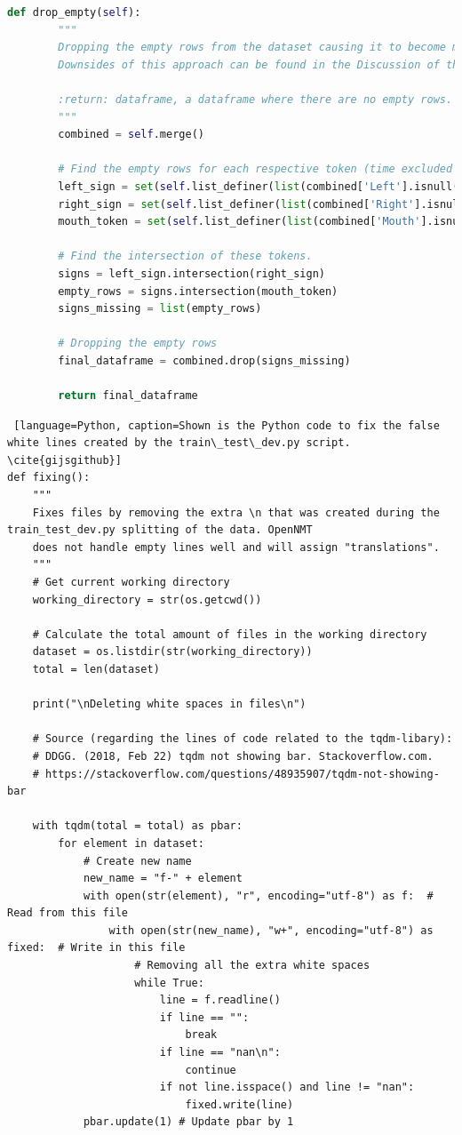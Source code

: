 \begin{lstlisting}[language=Python, caption=Shown is the Python code to merge the multiple CSV-files into one DataFrame. \cite{gijsgithub}]
    def drop_empty(self):
        """
        Dropping the empty rows from the dataset causing it to become more information packed.
        Downsides of this approach can be found in the Discussion of the written Thesis.

        :return: dataframe, a dataframe where there are no empty rows.
        """
        combined = self.merge()

        # Find the empty rows for each respective token (time excluded since it is always present).
        left_sign = set(self.list_definer(list(combined['Left'].isnull().values)))
        right_sign = set(self.list_definer(list(combined['Right'].isnull().values)))
        mouth_token = set(self.list_definer(list(combined['Mouth'].isnull().values)))

        # Find the intersection of these tokens.
        signs = left_sign.intersection(right_sign)
        empty_rows = signs.intersection(mouth_token)
        signs_missing = list(empty_rows)

        # Dropping the empty rows
        final_dataframe = combined.drop(signs_missing)

        return final_dataframe
\end{lstlisting}
 \break
{} \label{apx:fixing}
\begin{lstlisting} [language=Python, caption=Shown is the Python code to fix the false white lines created by the train\_test\_dev.py script. \cite{gijsgithub}]
def fixing():
    """
    Fixes files by removing the extra \n that was created during the train_test_dev.py splitting of the data. OpenNMT
    does not handle empty lines well and will assign "translations".
    """
    # Get current working directory
    working_directory = str(os.getcwd())

    # Calculate the total amount of files in the working directory
    dataset = os.listdir(str(working_directory))
    total = len(dataset)

    print("\nDeleting white spaces in files\n")

    # Source (regarding the lines of code related to the tqdm-libary):
    # DDGG. (2018, Feb 22) tqdm not showing bar. Stackoverflow.com.
    # https://stackoverflow.com/questions/48935907/tqdm-not-showing-bar

    with tqdm(total = total) as pbar:
        for element in dataset:
            # Create new name
            new_name = "f-" + element
            with open(str(element), "r", encoding="utf-8") as f:  # Read from this file
                with open(str(new_name), "w+", encoding="utf-8") as fixed:  # Write in this file
                    # Removing all the extra white spaces
                    while True:
                        line = f.readline()
                        if line == "":
                            break
                        if line == "nan\n":
                            continue
                        if not line.isspace() and line != "nan":
                            fixed.write(line)
            pbar.update(1) # Update pbar by 1
\end{lstlisting}


